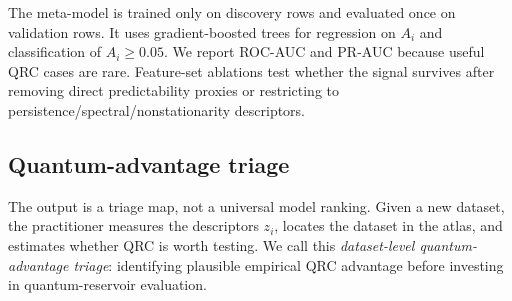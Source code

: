 The meta-model is trained only on discovery rows and evaluated once on validation rows. It uses gradient-boosted trees for regression on \(A_i\) and classification of \(A_i\geq 0.05\). We report ROC-AUC and PR-AUC because useful QRC cases are rare. Feature-set ablations test whether the signal survives after removing direct predictability proxies or restricting to persistence/spectral/nonstationarity descriptors.

\subsection{Quantum-advantage triage}

The output is a triage map, not a universal model ranking. Given a new dataset, the practitioner measures the descriptors \(z_i\), locates the dataset in the atlas, and estimates whether QRC is worth testing. We call this \emph{dataset-level quantum-advantage triage}: identifying plausible empirical QRC advantage before investing in quantum-reservoir evaluation.
